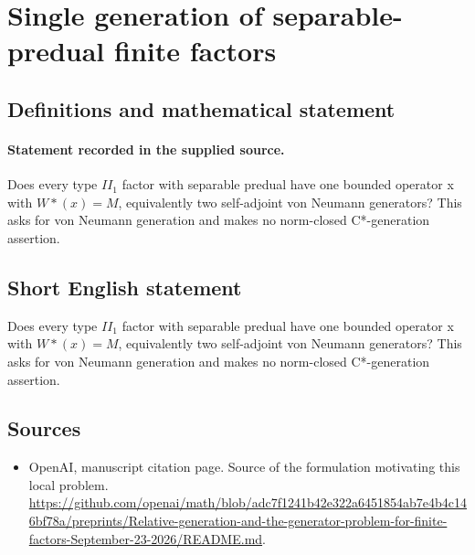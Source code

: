 \documentclass[11pt]{article}
\begin{document}
\section*{Single generation of separable-predual finite factors}\label{statement}
\subsection{Definitions and mathematical statement}
\paragraph{Statement recorded in the supplied source.}
Does every type $II_{1}$ factor with separable predual have one bounded operator x with $W*(x)=M$, equivalently two self-adjoint von Neumann generators? This asks for von Neumann generation and makes no norm-closed C*-generation assertion.
\subsection{Short English statement}
Does every type $II_{1}$ factor with separable predual have one bounded operator x with $W*(x)=M$, equivalently two self-adjoint von Neumann generators? This asks for von Neumann generation and makes no norm-closed C*-generation assertion.
\subsection{Sources}
\begin{itemize}
\item[S1] OpenAI, manuscript citation page. Source of the formulation motivating this local problem.
\url{https://github.com/openai/math/blob/adc7f1241b42e322a6451854ab7e4b4c146bf78a/preprints/Relative-generation-and-the-generator-problem-for-finite-factors-September-23-2026/README.md}.
\end{itemize}
\end{document}
